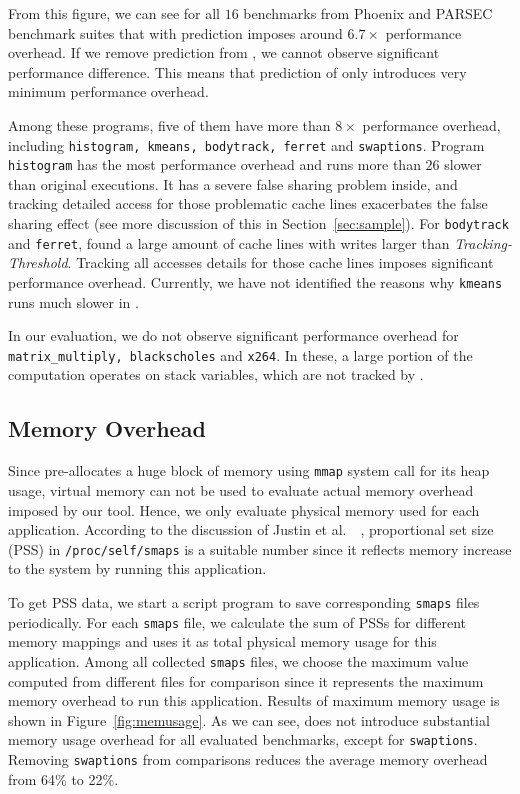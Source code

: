 From this figure, we can see for all $16$ benchmarks from Phoenix and PARSEC
benchmark suites that \Predator{} with prediction imposes around $6.7\times$
performance overhead. 
If we remove prediction from \Predator{}, we cannot observe significant performance difference.
This means that prediction of \Predator{} only introduces very minimum performance overhead. 

Among these programs, five of them have more than $8\times$ performance overhead, 
including \texttt{histogram, kmeans, bodytrack, ferret} and \texttt{swaptions}. 
Program \texttt{histogram} has the most performance overhead and 
runs more than $26$ slower than original executions. 
It has a severe false sharing problem inside, and tracking detailed access for those
problematic cache lines exacerbates the 
false sharing effect (see more discussion of this in Section~\ref{sec:sample}). 
For \texttt{bodytrack} and \texttt{ferret}, \Predator{} found a large amount of cache lines with 
writes larger than {\it Tracking-Threshold}. 
Tracking all accesses details for those cache lines 
imposes significant performance overhead. 
Currently, we have not identified the reasons 
why \texttt{kmeans} runs much slower in \Predator{}.   

In our evaluation, we do not observe significant performance overhead for
\texttt{matrix\_multiply, blackscholes} and 
\texttt{x264}.
In these, a large portion of the computation operates on stack variables, which are
not tracked by \Predator{}. 

\subsection{Memory Overhead}
\label{sec:memoverhead}
Since \Predator{} pre-allocates a huge block of memory
using \texttt{mmap} system call for its heap usage, 
virtual memory can not be used to evaluate actual memory overhead imposed by our tool. 
Hence, we only evaluate physical memory used for each application. 
According to the discussion of Justin et al.\ ~\cite{memusage}, proportional set size (PSS) 
in \texttt{/proc/self/smaps} is a suitable number since it reflects memory increase to the system
by running this application. 

To get PSS data, we start a script program to save 
corresponding \texttt{smaps} files periodically.
For each \texttt{smaps} file, we calculate the sum of PSSs for different
memory mappings and uses it as total physical memory usage for this application.
Among all collected \texttt{smaps} files, we choose the maximum value computed from
different files for comparison 
since it represents the maximum memory overhead to run this application.
Results of maximum memory usage is shown in Figure~\ref{fig:memusage}. As we can see,
\Predator{} does not introduce substantial memory usage overhead 
for all evaluated benchmarks, except for \texttt{swaptions}. 
Removing \texttt{swaptions} from comparisons reduces 
the average memory overhead from 64\% to 22\%. 

